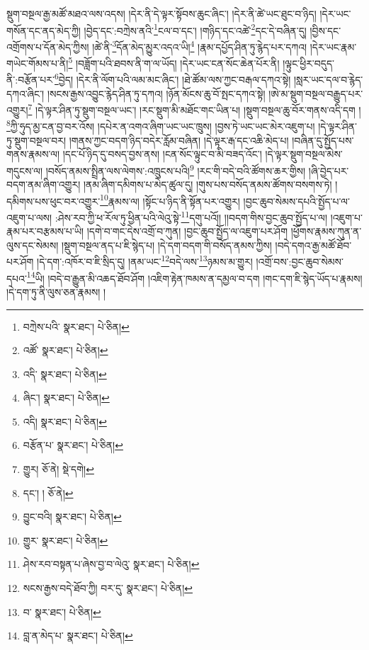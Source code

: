 སྡུག་བསྔལ་རྒྱ་མཚོ་མཐའ་ལས་འདས། །དེར་ནི་དེ་ལྟར་སྟོབས་ཆུང་ཞིང་། །དེར་ནི་ཚེ་ཡང་ཐུང་བ་ཉིད། །དེར་ཡང་གསོན་དང་ནད་མེད་ཀྱི། །བྱེད་དང་:བཀྲེས་ནའི་\footnote{བཀྲེས་པའི་  སྣར་ཐང་།  པེ་ཅིན། }ངལ་བ་དང་། །གཉིད་དང་འཚེ་\footnote{འཚོ་  སྣར་ཐང་།  པེ་ཅིན། }དང་དེ་བཞིན་དུ། །བྱིས་དང་འགྲོགས་པ་དོན་མེད་ཀྱིས། །ཚེ་ནི་\footnote{འདི་  སྣར་ཐང་།  པེ་ཅིན། }དོན་མེད་མྱུར་འདའ་ཡི།\footnote{ཞིང་།  སྣར་ཐང་།  པེ་ཅིན། } །རྣམ་དཔྱོད་ཤིན་ཏུ་རྙེད་པར་དཀའ། །དེར་ཡང་རྣམ་གཡེང་གོམས་པ་ནི།\footnote{འདི།  སྣར་ཐང་།  པེ་ཅིན། } །བཟློག་པའི་ཐབས་ནི་ག་ལ་ཡོད། །དེར་ཡང་ངན་སོང་ཆེན་པོར་ནི། །ལྟུང་ཕྱིར་བདུད་ནི་:བརྩོན་པར་\footnote{བརྩོན་པ་  སྣར་ཐང་།  པེ་ཅིན། }བྱེད། །དེར་ནི་ལོག་པའི་ལམ་མང་ཞིང་། །ཐེ་ཚོམ་ལས་ཀྱང་བརྒལ་དཀའ་སྟེ། །སླར་ཡང་དལ་བ་རྙེད་དཀའ་ཞིང་། །སངས་རྒྱས་འབྱུང་རྙེད་ཤིན་ཏུ་དཀའ། །ཉོན་མོངས་ཆུ་བོ་སྤང་དཀའ་སྟེ། །ཨེ་མ་སྡུག་བསྔལ་བརྒྱུད་པར་འགྱུར།\footnote{གྱུར།  ཅོ་ནེ།  སྡེ་དགེ། } །དེ་ལྟར་ཤིན་ཏུ་སྡུག་བསྔལ་ཡང་། །རང་སྡུག་མི་མཐོང་གང་ཡིན་པ། །སྡུག་བསྔལ་ཆུ་བོར་གནས་འདི་དག །\footnote{དང་། །  ཅོ་ནེ། }ཀྱི་ཧུད་མྱ་ངན་བྱ་བར་འོས། །དཔེར་ན་འགའ་ཞིག་ཡང་ཡང་ཁྲུས། །བྱས་ཏེ་ཡང་ཡང་མེར་འཇུག་པ། །དེ་ལྟར་ཤིན་ཏུ་སྡུག་བསྔལ་བར། །གནས་ཀྱང་བདག་ཉིད་བདེར་རློམ་བཞིན། །དེ་ལྟར་རྒ་དང་འཆི་མེད་པ། །བཞིན་དུ་སྤྱོད་པས་གནས་རྣམས་ལ། །དང་པོ་ཉིད་དུ་བསད་བྱས་ནས། །ངན་སོང་ལྟུང་བ་མི་བཟད་འོང་། །དེ་ལྟར་སྡུག་བསྔལ་མེས་གདུངས་ལ། །བསོད་ནམས་སྤྲིན་ལས་ལེགས་:འཁྲུངས་པའི།\footnote{བྱུང་བའི།  སྣར་ཐང་།  པེ་ཅིན། } །རང་གི་བདེ་བའི་ཚོགས་ཆར་གྱིས། །ཞི་བྱེད་པར་བདག་ནམ་ཞིག་འགྱུར། །ནམ་ཞིག་དམིགས་པ་མེད་ཚུལ་དུ། །གུས་པས་བསོད་ནམས་ཚོགས་བསགས་ཏེ། །དམིགས་པས་ཕུང་བར་འགྱུར་\footnote{གྱུར་  སྣར་ཐང་།  པེ་ཅིན། }རྣམས་ལ། །སྟོང་པ་ཉིད་ནི་སྟོན་པར་འགྱུར། །བྱང་ཆུབ་སེམས་དཔའི་སྤྱོད་པ་ལ་འཇུག་པ་ལས། :ཤེས་རབ་ཀྱི་ཕ་རོལ་ཏུ་ཕྱིན་པའི་ལེའུ་སྟེ་\footnote{ཤེས་རབ་བསྟན་པ་ཞེས་བྱ་བ་ལེའུ་  སྣར་ཐང་།  པེ་ཅིན། }དགུ་པའོ།། །།བདག་གིས་བྱང་ཆུབ་སྤྱོད་པ་ལ། །འཇུག་པ་རྣམ་པར་བརྩམས་པ་ཡི། །དགེ་བ་གང་དེས་འགྲོ་བ་ཀུན། །བྱང་ཆུབ་སྤྱོད་ལ་འཇུག་པར་ཤོག །ཕྱོགས་རྣམས་ཀུན་ན་ལུས་དང་སེམས། །སྡུག་བསྔལ་ནད་པ་ཇི་སྙེད་པ། །དེ་དག་བདག་གི་བསོད་ནམས་ཀྱིས། །བདེ་དགའ་རྒྱ་མཚོ་ཐོབ་པར་ཤོག །དེ་དག་:འཁོར་བ་ཇི་སྲིད་དུ། །ནམ་ཡང་\footnote{སངས་རྒྱས་བདེ་ཐོབ་ཀྱི། བར་དུ་  སྣར་ཐང་།  པེ་ཅིན། }བདེ་ལས་\footnote{བ་  སྣར་ཐང་།  པེ་ཅིན། }ཉམས་མ་གྱུར། །འགྲོ་བས་:བྱང་ཆུབ་སེམས་དཔའ་\footnote{བླ་ན་མེད་པ་  སྣར་ཐང་།  པེ་ཅིན། }ཡི། །བདེ་བ་རྒྱུན་མི་འཆད་ཐོབ་ཤོག །འཇིག་རྟེན་ཁམས་ན་དམྱལ་བ་དག །གང་དག་ཇི་སྙེད་ཡོད་པ་རྣམས། །དེ་དག་ཏུ་ནི་ལུས་ཅན་རྣམས། །
